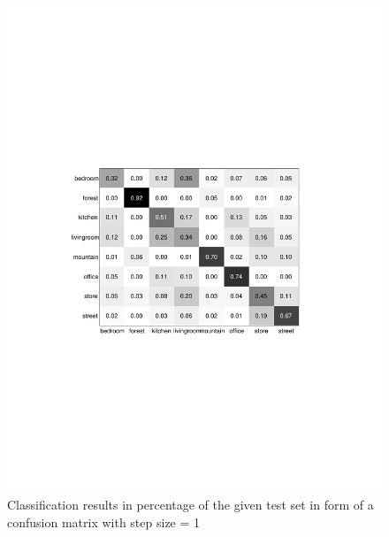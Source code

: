 \documentclass[subfigure,epsfig,fleqn,float,numbers=noenddot]{scrartcl}
\begin{document}
\begin{figure}
		\centering
		\includegraphics[width=\textwidth]{img/conf_matrix_step1.pdf}
		\caption{Classification results in percentage of the given test set in form of a confusion matrix with step size = 1}
		\label{fig:stepsize}
\end{figure}
\end{document}
